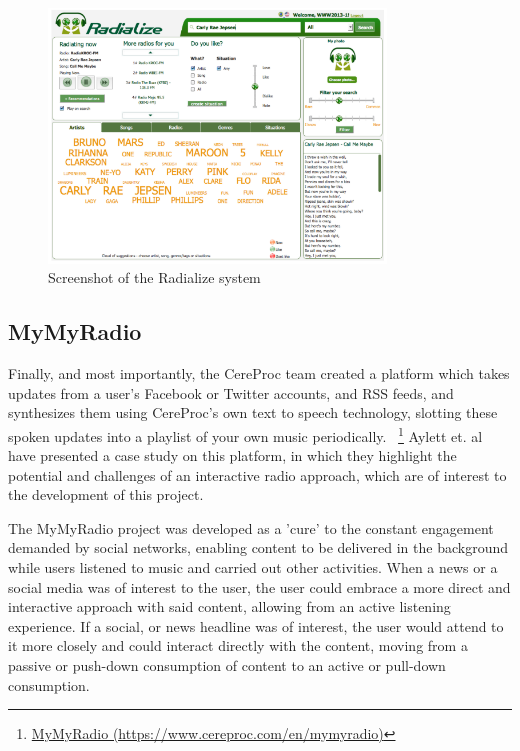 \begin{figure}[h]
\centering
\includegraphics[width=0.8\textwidth]{./Images/radialize.png}
\caption{Screenshot of the Radialize system}
\label{fig:test_env}
\end{figure}

\subsection{MyMyRadio}

Finally, and most importantly, the CereProc team created a platform which takes updates from a user's Facebook or Twitter accounts, and RSS feeds, and synthesizes them using CereProc's own text to speech technology, slotting these spoken updates into a playlist of your own music periodically. ~\footnote{\href{https://www.cereproc.com/en/mymyradio}{MyMyRadio (https://www.cereproc.com/en/mymyradio)}} Aylett et. al~\cite{Aylett2015} have presented a case study on this platform, in which they highlight the potential and challenges of an interactive radio approach, which are of interest to the development of this project.

The MyMyRadio project was developed as a 'cure' to the constant engagement demanded by social networks, enabling content to be delivered in the background while users listened to music and carried out other activities. When a news or a social media was of interest to the user, the user could embrace a more direct and interactive approach with said content, allowing from an active listening experience. If a social, or news headline was of interest, the user would attend to it more closely and could interact directly with the content, moving from a passive or push-down consumption of content to an active or pull-down consumption.

